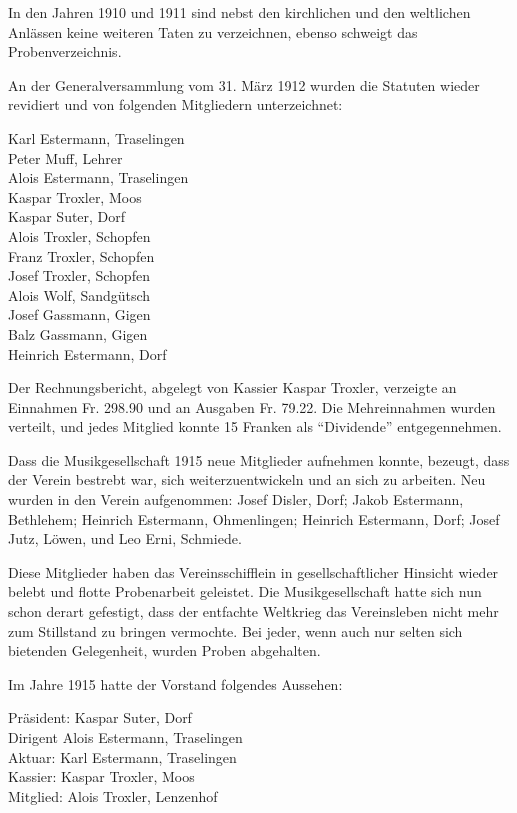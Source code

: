 \begin{history}
    In den Jahren 1910 und 1911 sind nebst den kirchlichen und den weltlichen
    Anlässen keine weiteren Taten zu verzeichnen, ebenso schweigt das
    Probenverzeichnis.

    An der Generalversammlung vom 31. März 1912 wurden die Statuten wieder
    revidiert und von folgenden Mitgliedern unterzeichnet:

    \noindent
    Karl Estermann, Traselingen\\
    Peter Muff, Lehrer\\
    Alois Estermann, Traselingen\\
    Kaspar Troxler, Moos\\
    Kaspar Suter, Dorf\\
    Alois Troxler, Schopfen\\
    Franz Troxler, Schopfen\\
    Josef Troxler, Schopfen\\
    Alois Wolf, Sandgütsch\\
    Josef Gassmann, Gigen\\
    Balz Gassmann, Gigen\\
    Heinrich Estermann, Dorf

    Der Rechnungsbericht, abgelegt von Kassier Kaspar Troxler, verzeigte an
    Einnahmen Fr. 298.90 und an Ausgaben Fr. 79.22. Die Mehreinnahmen wurden
    verteilt, und jedes Mitglied konnte 15 Franken als \enquote{Dividende}
    entgegennehmen.

    Dass die Musikgesellschaft 1915 neue Mitglieder aufnehmen konnte, bezeugt,
    dass der Verein bestrebt war, sich weiterzuentwickeln und an sich zu
    arbeiten. Neu wurden in den Verein aufgenommen: Josef Disler, Dorf; Jakob
    Estermann, Bethlehem; Heinrich Estermann, Ohmenlingen; Heinrich Estermann,
    Dorf; Josef Jutz, Löwen, und Leo Erni, Schmiede.

    Diese Mitglieder haben das Vereinsschifflein in gesellschaftlicher Hinsicht
    wieder belebt und flotte Probenarbeit geleistet. Die Musikgesellschaft hatte
    sich nun schon derart gefestigt, dass der entfachte Weltkrieg das
    Vereinsleben nicht mehr zum Stillstand zu bringen vermochte. Bei jeder, wenn
    auch nur selten sich bietenden Gelegenheit, wurden Proben abgehalten.

    Im Jahre 1915 hatte der Vorstand folgendes Aussehen:

    \noindent
    Präsident: Kaspar Suter, Dorf\\
    Dirigent Alois Estermann, Traselingen\\
    Aktuar: Karl Estermann, Traselingen\\
    Kassier: Kaspar Troxler, Moos\\
    Mitglied: Alois Troxler, Lenzenhof


\end{history}
